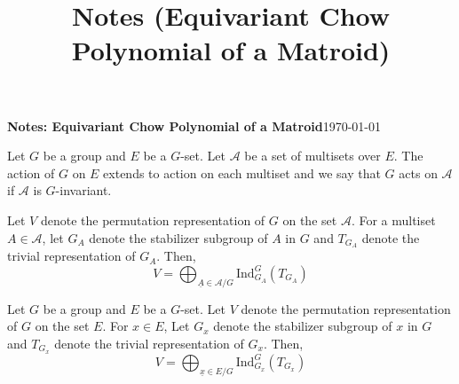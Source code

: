 \documentclass[12pt]{article}
\title{Notes (Equivariant Chow Polynomial of a Matroid)}
\newcommand{\calA}{\mathcal{A}}
\newcommand{\ind}{\text{Ind}}
\begin{document}
{\textbf{Notes: Equivariant Chow Polynomial of a Matroid}}\hfill \small{\today}

\hrulefill

\vspace*{5mm}
\hspace*{5mm} Let $G$ be a group and $E$ be a $G$-set. Let $\calA$ be a set of multisets over $E$.
The action of $G$ on $E$ extends to action on each multiset and
we say that $G$ acts on $\calA$ if $\calA$ is $G$-invariant.

\hspace*{5mm} Let $V$ denote the permutation representation of $G$ on the set $\calA$. For a multiset
$A\in\calA$, let $G_A$ denote the stabilizer subgroup of $A$ in $G$ and $T_{G_A}$ denote the trivial
representation of $G_A$. Then,
$$V = \bigoplus_{\underline{A}\in \calA/G}{\ind_{G_A}^G(T_{G_A})} $$

\hrulefill

\vspace*{5mm}
\hspace*{5mm} Let $G$ be a group and $E$ be a $G$-set.
Let $V$ denote the permutation representation of $G$ on the set $E$. For $x\in E$,
Let $G_x$ denote the stabilizer subgroup of $x$ in $G$ and $T_{G_x}$ denote the trivial representation
of $G_x$. Then,
$$V = \bigoplus_{\underline{x}\in E/G}{\ind_{G_x}^G(T_{G_x})} $$
\end{document}
